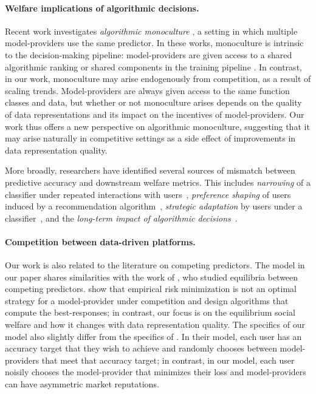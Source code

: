 \documentclass[letterpaper,11pt]{article}
\theoremstyle{plain}
\begin{document}
\paragraph{Welfare implications of algorithmic decisions.} Recent work investigates \textit{algorithmic monoculture} \citep{KR21, BCKJL22}, a setting in which multiple model-providers use the same predictor. In these works, monoculture is  intrinsic to the decision-making pipeline: model-providers are given access to a shared algorithmic ranking \citep{KR21} or shared components in the training pipeline \citep{BCKJL22}. In contrast, in our work, monoculture may arise endogenously from competition, as a result of scaling trends. Model-providers are always given access to the same function classes and data, but whether or not monoculture arises depends on the quality of data representations and its impact on the incentives of model-providers. Our work thus offers a new perspective on algorithmic monoculture, suggesting that it may arise naturally in competitive settings as a side effect of improvements in data representation quality.

More broadly, researchers have identified several sources of mismatch between predictive accuracy and downstream welfare metrics. This includes \textit{narrowing} of a classifier under repeated interactions with users~\citep{HSNL18}, \textit{preference shaping} of users induced by a recommendation algorithm~\citep{CDHR22, DM22, CHRH22}, 
\textit{strategic adaptation} by users under a classifier~\citep{bruckner12pred, hardt16strat}, and the \textit{long-term impact of algorithmic decisions}~\citep{LDRSH18, LWHKBC20}. 

\paragraph{Competition between data-driven platforms.} Our work is also related to the literature on competing predictors. The model in our paper shares similarities with the work of \citet{BT17, BT19}, who studied equilibria between competing predictors. \citet{BT17, BT19} show that empirical risk minimization is not an optimal strategy for a model-provider under competition and design algorithms that compute the best-responses; in contrast, our focus is on the equilibrium social welfare and how it changes with data representation quality. The specifics of our model also slightly differ from the specifics of \citet{BT17, BT19}. In their model, each user has an accuracy target that they wish to achieve and randomly chooses between model-providers that meet that accuracy target; in contrast, in our model, each user noisily chooses the model-provider that minimizes their loss and model-providers can have asymmetric market reputations. 
\end{document}
